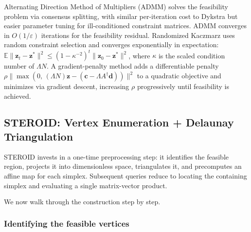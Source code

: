 \documentclass[review,onefignum,onetabnum]{./SIAM_template/siamart171218}
\begin{document}
Alternating Direction Method of Multipliers (ADMM) \cite{BoydADMM2011} solves
the feasibility problem via consensus splitting,
with similar per-iteration cost to Dykstra but easier parameter tuning for
ill-conditioned constraint matrices.
ADMM converges in $O(1/\varepsilon)$
iterations for the feasibility residual.
Randomized Kaczmarz \cite{Strohmer2009} uses random constraint selection and
converges exponentially in expectation:
$\mathbb{E}\|\mathbf{z}_t - \mathbf{z}^*\|^2 \leq (1 - \kappa^{-2})^t
	\|\mathbf{z}_0 - \mathbf{z}^*\|^2$, where $\kappa$ is the scaled condition
number of $\Lambda N$.
A gradient-penalty method adds a differentiable penalty
$\rho \|\max(0,\, (\Lambda N)\mathbf{z} - (\mathbf{c} - \Lambda A^\dagger
	\mathbf{d}))\|^2$ to a quadratic objective and minimizes via gradient descent,
increasing $\rho$ progressively until feasibility is achieved.

\subsection{STEROID: Vertex Enumeration + Delaunay Triangulation}
\label{sec:steroid}

STEROID invests in a one-time preprocessing step: it identifies the feasible
region, projects it into dimensionless space, triangulates it, and precomputes
an affine map for each simplex.  Subsequent queries reduce to locating
the containing simplex and evaluating a single matrix-vector product.

We now walk through the construction step by step.

\subsubsection{Identifying the feasible vertices}
\end{document}
